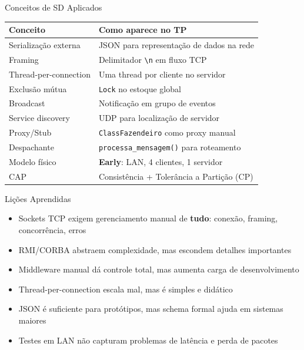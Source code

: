 \documentclass[aspectratio=169]{beamer}
\begin{document}
\begin{frame}{Conceitos de SD Aplicados}
  \footnotesize
  \begin{tabular}{>{\raggedright\arraybackslash}p{3.5cm}>{\raggedright\arraybackslash}p{9cm}}
    \toprule
    \textbf{Conceito} & \textbf{Como aparece no TP} \\
    \midrule
    Serializa\c{c}\~ao externa & JSON para representa\c{c}\~ao de dados na rede \\
    Framing & Delimitador \texttt{\textbackslash n} em fluxo TCP \\
    Thread-per-connection & Uma thread por cliente no servidor \\
    Exclus\~ao m\'utua & \texttt{Lock} no estoque global \\
    Broadcast & Notifica\c{c}\~ao em grupo de eventos \\
    Service discovery & UDP para localiza\c{c}\~ao de servidor \\
    Proxy/Stub & \texttt{ClassFazendeiro} como proxy manual \\
    Despachante & \texttt{processa\_mensagem()} para roteamento \\
    Modelo f\'isico & \textbf{Early}: LAN, 4 clientes, 1 servidor \\
    CAP & Consist\^encia + Toler\^ancia a Parti\c{c}\~ao (CP) \\
    \bottomrule
  \end{tabular}
\end{frame}

\begin{frame}{Li\c{c}\~oes Aprendidas}
  \begin{itemize}
    \item Sockets TCP exigem gerenciamento manual de \textbf{tudo}: conex\~ao, framing, concorr\^encia, erros
    \item RMI/CORBA abstraem complexidade, mas escondem detalhes importantes
    \item Middleware manual d\'a controle total, mas aumenta carga de desenvolvimento
    \item Thread-per-connection escala mal, mas \'e simples e did\'atico
    \item JSON \'e suficiente para prot\'otipos, mas schema formal ajuda em sistemas maiores
    \item Testes em LAN n\~ao capturam problemas de lat\^encia e perda de pacotes
  \end{itemize}
\end{frame}
\end{document}
